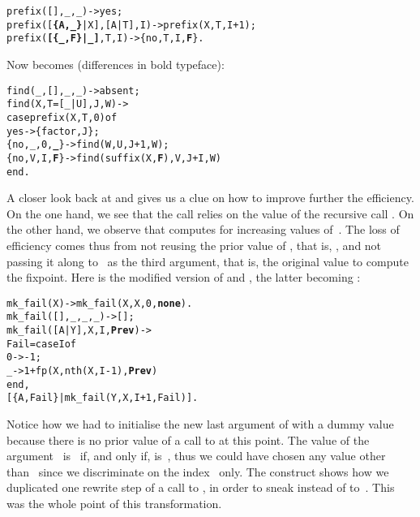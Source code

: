 \begin{alltt}
prefix(       [],    _,_) -> yes;
prefix([\textbf{\{A,_\}}|X],[A|T],I) -> prefix(X,T,I+1);
prefix(\textbf{[\{_,F\}|_]},    T,I) -> \{no,T,I,\textbf{F}\}.\hfill% F \emph{is} \(\MPfailure{x}{}{i}\)
\end{alltt}
Now  becomes (differences in bold typeface):
\begin{alltt}
find(_,     [],_,_) -> absent;
find(X,T=[_|U],J,W) ->
  case prefix(X,T,0) of
    yes        -> \{factor,J\};
    \{no,_,0,\textbf{_}\} -> find(W,U,J+1,W);\hfill% \emph{Here}
    \{no,V,I,\textbf{F}\} -> find(suffix(X,\textbf{F}),V,J+I,W)\hfill% \emph{and here}
  end.
\end{alltt}
A closer look back at  and  gives
us a clue on how to improve further the efficiency. On the one hand,
we see that the call  relies on the value of the
recursive call . On the other hand, we observe
that  computes  for increasing
values of~. The loss of efficiency comes thus from
 not reusing the prior value of
, that is, , and not passing
it along to~ as the third argument, that is, the
original value to compute the fixpoint. Here is the modified version
of  and , the latter becoming
:
\begin{alltt}
mk_fail(X)              -> mk_fail(X,X,0,\textbf{none}).
mk_fail(   [],_,_,   _) -> [];
mk_fail([A|Y],X,I,\textbf{Prev}) -> 
  Fail = case I of
           0 -> -1;
           _ -> 1 + fp(X,nth(X,I-1),\textbf{Prev})
         end,
  [\{A,Fail\}|mk_fail(Y,X,I+1,Fail)].
\end{alltt}
Notice how we had to initialise the new last argument of
 with a dummy value  because there
is no prior value of a call to  at this point. The
value of the argument~ is~ if, and only if,
 is~, thus we could have chosen any value
other than~ since we discriminate on the
index~ only. The  construct shows how we
duplicated one rewrite step of a call to , in order to
sneak  instead of 
to~. This was the whole point of this transformation.

